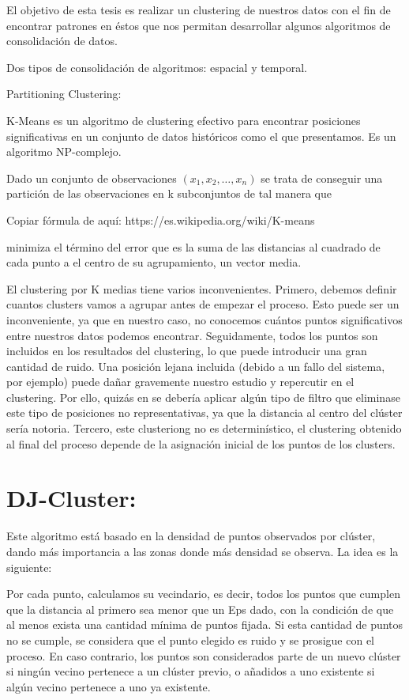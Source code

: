 \documentclass[a4paper,12pt]{article}
\begin{document}
El objetivo de esta tesis es realizar un clustering de nuestros datos con el fin de encontrar patrones en \'estos que nos permitan desarrollar algunos algoritmos de consolidaci\'on de datos. 

Dos tipos de consolidaci\'on de algoritmos: espacial y temporal. 


Partitioning Clustering:

K-Means es un algoritmo de clustering efectivo para encontrar posiciones significativas en un conjunto de datos hist\'oricos como el que presentamos. Es un algoritmo NP-complejo.

Dado un conjunto de observaciones $(x_1, x_2, …, x_n)$ se trata de conseguir una partici\'on de las observaciones en k subconjuntos de tal manera que 

Copiar f\'ormula de aqu\'i: https://es.wikipedia.org/wiki/K-means

minimiza el t\'ermino del error que es la suma de las distancias al cuadrado de cada punto a el centro de su agrupamiento, un vector media. 

El clustering por K medias tiene varios inconvenientes. Primero, debemos definir cuantos clusters vamos a agrupar antes de empezar el proceso. Esto puede ser un inconveniente, ya que en nuestro caso, no conocemos cu\'antos puntos significativos entre nuestros datos podemos encontrar. Seguidamente, todos los puntos son incluidos en los resultados del clustering, lo que puede introducir una gran cantidad de ruido. Una posici\'on lejana incluida (debido a un fallo del sistema, por ejemplo) puede dañar gravemente nuestro estudio y repercutir en el clustering. Por ello, quiz\'as en se deber\'ia aplicar alg\'un tipo de filtro que eliminase este tipo de posiciones no representativas, ya que la distancia al centro del cl\'uster ser\'ia notoria. Tercero, este clusteriong no es determin\'istico, el clustering obtenido al final del proceso depende de la asignaci\'on inicial de los puntos de los clusters. 

\section{DJ-Cluster:}

Este algoritmo est\'a basado en la densidad de puntos observados por cl\'uster, dando m\'as importancia a las zonas donde m\'as densidad se observa. La idea es la siguiente:

Por cada punto, calculamos su vecindario, es decir, todos los puntos que cumplen que la distancia al primero sea menor que un Eps dado, con la condici\'on de que al menos exista una cantidad m\'inima de puntos fijada. Si esta cantidad de puntos no se cumple, se considera que el punto elegido es ruido  y se prosigue con el proceso. En caso contrario, los puntos son considerados parte de un nuevo cl\'uster si ning\'un vecino pertenece a un cl\'uster previo, o añadidos a uno existente si alg\'un vecino pertenece a uno ya existente.
\end{document}
